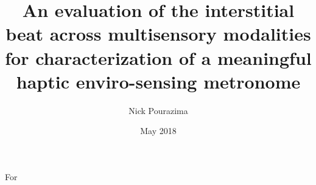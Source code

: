 \documentclass[12pt]{cmuthesis}
\begin{document}
 
\frontmatter

\pagestyle{empty}

\title{ %
{\bf An evaluation of the interstitial beat across multisensory modalities for characterization of a meaningful haptic enviro-sensing metronome}}
\author{Nick Pourazima}
\date{May 2018}
\trnumber{}


\support{}
\disclaimer{}



\maketitle

\begin{dedication}
For
\end{dedication}

\pagestyle{plain} %

\end{document}
